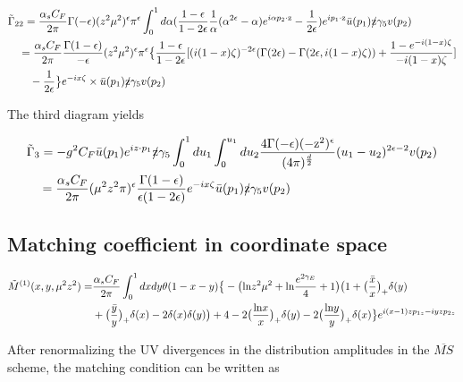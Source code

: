 \documentclass{article}
\begin{document}
  
     \begin{align}{}
   	&\tilde{\Gamma}_{22} =\frac{\alpha_s C_F}{2\pi} \Gamma(-\epsilon)(z^2\mu^2)^\epsilon \pi^\epsilon \int_{0}^{1}d\alpha (\frac{1-\epsilon}{1-2\epsilon}\frac{1}{\alpha} (\alpha^{2\epsilon}-\alpha)e^{i \alpha p_2 \cdot \text{z}}-\frac{1}{2\epsilon})e^{i p_1 \cdot \text{z}} \bar{u}(p_1) \slashed{\text{z}} \gamma_5 v(p_2)\notag\\		
   	& \quad =\frac{\alpha_s C_F}{2\pi} \frac{\Gamma(1-\epsilon)}{-\epsilon} (z^2\mu^2)^\epsilon \pi^\epsilon \big\{\frac{1-\epsilon}{1-2\epsilon}[(i (1-x)\zeta)^{-2\epsilon}(\Gamma(2\epsilon)-\Gamma(2\epsilon,i(1-x)\zeta))+\frac{1-e^{-i (1-x)\zeta}}{-i(1-x)\zeta}]\notag\\
   	& \qquad-\frac{1}{2\epsilon}\big\}e^{-ix\zeta} \times \bar{u}(p_1) \slashed{\text{z}} \gamma_5 v(p_2)\notag\\	
   \end{align}
  
  The third diagram yields

    \begin{align}{}
    &\tilde{\Gamma}_3=-g^2 C_F\bar{u}(p_1) e^{i z \cdot p_1} \slashed{\text{z}} \gamma_5 \int_{0}^{1} du_1 \int_{0}^{u_1} du_2 \frac{4 \Gamma(-\epsilon) (-\text{z}^2)^\epsilon}{(4\pi)^{\frac{d}{2}}}(u_1-u_2)^{2\epsilon-2} v(p_2)\notag\\
 	&\quad =\frac{\alpha_s C_F}{2\pi} (\mu^2 z^2 \pi)^\epsilon \frac{\Gamma(1-\epsilon)}{\epsilon(1-2\epsilon)}e^{-ix\zeta} \bar{u}(p_1) \slashed{\text{z}} \gamma_5 v(p_2)\notag\\
    \end{align}


\subsection{Matching coefficient in coordinate space}

\begin{align}{}
    \tilde{M}^{(1)}(x,y,\mu^2 z^2)=&\frac{\alpha_s C_F}{2\pi} \int_{0}^{1} dx dy \theta(1-x-y)\big\{-\big(\text{ln}z^2\mu^2+\text{ln}\frac{e^{2 \gamma_E}}{4}+1\big)\big(1+\big(\frac{\bar{x}}{x}\big)_+\delta(y)\notag\\
    &+\big(\frac{\bar{y}}{y}\big)_+\delta(x)-2\delta(x)\delta(y)\big)+4-2\big(\frac{\text{ln}x}{x}\big)_+\delta(y)-2\big(\frac{\text{ln}y}{y}\big)_+\delta(x)\big\}e^{i(x-1)z p_{1z}-iyz p_{2z}}
\end{align}

After renormalizing the UV divergences in the distribution amplitudes in the $\overline{MS}$ scheme, the matching condition can be written as
\end{document}
